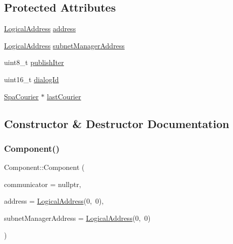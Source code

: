 \subsection*{Protected Attributes}
\begin{DoxyCompactItemize}
\item 
\hyperlink{structLogicalAddress}{Logical\+Address} \hyperlink{classComponent_aa60ef4220c2630dde612e2f0164b3676}{address}
\item 
\hyperlink{structLogicalAddress}{Logical\+Address} \hyperlink{classComponent_a8147bae546da489c3ffa5a1a634739a0}{subnet\+Manager\+Address}
\item 
uint8\+\_\+t \hyperlink{classComponent_a5dff98c7893ff79b6ff35cdc26f65240}{publish\+Iter}
\item 
uint16\+\_\+t \hyperlink{classComponent_a6d22415eb4e07f9cc5a5c917972bf0dd}{dialog\+Id}
\item 
\hyperlink{structSpaCourier}{Spa\+Courier} $\ast$ \hyperlink{classComponent_ab8aa5882c1e2c8139e3ec9d9d27ff174}{last\+Courier}
\end{DoxyCompactItemize}


\subsection{Constructor \& Destructor Documentation}
\mbox{\label{classComponent_a83f43d60a90000cfd63aca351ba648c4}} 
\subsubsection{\texorpdfstring{Component()}{Component()}}
{\footnotesize\ttfamily Component\+::\+Component (\begin{DoxyParamCaption}\item[{std\+::shared\+\_\+ptr$<$ \hyperlink{classSpaCommunicator}{Spa\+Communicator} $>$}]{communicator = {\ttfamily nullptr},  }\item[{\hyperlink{structLogicalAddress}{Logical\+Address}}]{address = {\ttfamily \hyperlink{structLogicalAddress}{Logical\+Address}(0,~0)},  }\item[{\hyperlink{structLogicalAddress}{Logical\+Address}}]{subnet\+Manager\+Address = {\ttfamily \hyperlink{structLogicalAddress}{Logical\+Address}(0,~0)} }\end{DoxyParamCaption})\hspace{0.3cm}{\ttfamily [inline]}}

